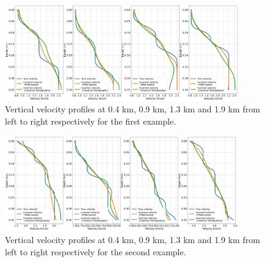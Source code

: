 \begin{figure}
 \centering
 \includegraphics[width=0.9\textwidth]{figures/chap03_pinn_enabled/example_1_profiles} 
 \caption{Vertical velocity profiles at 0.4 km, 0.9 km, 1.3 km and 1.9 km from left to right respectively for the first example.}
 \label{fig:example_1_profiles}
\end{figure}

\begin{figure}
 \centering
 \includegraphics[width=0.9\textwidth]{figures/chap03_pinn_enabled/example_2_profiles} 
 \caption{Vertical velocity profiles at 0.4 km, 0.9 km, 1.3 km and 1.9 km from left to right respectively for the second example.}
 \label{fig:example_2_profiles}
\end{figure}

